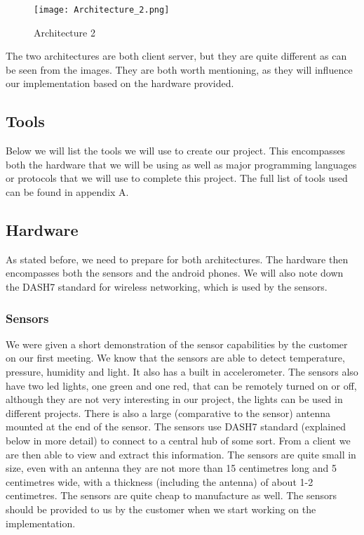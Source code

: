 \documentclass[../document.tex]{subfiles}
\begin{document}
\begin{figure}[H]
	\centering
		\texttt{[image: Architecture\_2.png]}
	\caption{Architecture 2}
\end{figure}

The two architectures are both client server, but they are quite different as can be seen from the images. They are both worth mentioning, as they will influence our implementation based on the hardware provided.

\subsection{Tools}
Below we will list the tools we will use to create our project. This encompasses both the hardware that we will be using as well as major programming languages or protocols that we will use to complete this project. The full list of tools used can be found in appendix A.

\subsection{Hardware}
As stated before, we need to prepare for both architectures. The hardware then encompasses both the sensors and the android phones. We will also note down the DASH7 standard for wireless networking, which is used by the sensors.

\subsubsection{Sensors}
We were given a short demonstration of the sensor capabilities by the customer on our first meeting. We know that the sensors are able to detect temperature, pressure, humidity and light. It also has a built in accelerometer. The sensors also have two led lights, one green and one red, that can be remotely turned on or off, although they are not very interesting in our project, the lights can be used in different projects. There is also a large (comparative to the sensor) antenna mounted at the end of the sensor. The sensors use DASH7 standard (explained below in more detail) to connect to a central hub of some sort. From a client we are then able to view and extract this information. The sensors are quite small in size, even with an antenna they are not more than 15 centimetres long and 5 centimetres wide, with a thickness (including the antenna) of about 1-2 centimetres. The sensors are quite cheap to manufacture as well. The sensors should be provided to us by the customer when we start working on the implementation.
\end{document}
